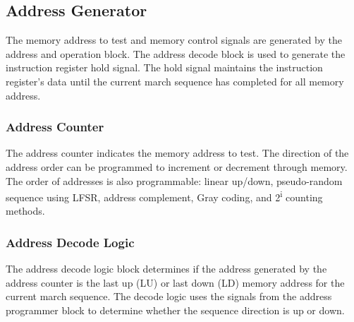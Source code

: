\subsection{Address Generator}
\label{sect:bg-blocks-address-generator}
The memory address to test and memory control signals are generated by the address and operation block.  The address decode block is used to generate the instruction register hold signal.  The hold signal maintains the instruction register's data until the current march sequence has completed for all memory address.  

\subsubsection{Address Counter}
The address counter indicates the memory address to test.  The direction of the address order can be programmed to increment or decrement through memory.  The order of addresses is also programmable: linear up/down, pseudo-random sequence using LFSR, address complement, Gray coding, and 2\textsuperscript{i} counting methods.
 
\subsubsection{Address Decode Logic}
The address decode logic block determines if the address generated by the address counter is the last up (LU) or last down (LD) memory address for the current march sequence.  The decode logic uses the signals from the address programmer block to determine whether the sequence direction is up or down.   


